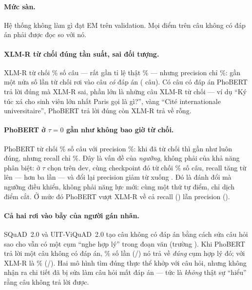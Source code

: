 \paragraph{Mức sàn.} Hệ thống không làm gì đạt EM \AbstainEM{} trên validation. Mọi điểm trên câu không
có đáp án phải được đọc so với nó.

\paragraph{XLM-R từ chối đúng tần suất, sai đối tượng.} XLM-R từ chối \XlmrAbsRate\% số câu --- rất gần
tỉ lệ thật \PctValImp\% --- nhưng precision chỉ \XlmrAbsPrec\%: gần một nửa số lần từ chối rơi vào câu
\emph{có} đáp án (\XlmrErrFalseAbs{} câu). Có \PairAnsOnlyP{} câu có đáp án PhoBERT trả lời đúng mà XLM-R
sai, phần lớn là những câu XLM-R từ chối --- ví dụ ``Ký túc xá cho sinh viên lớn nhất Paris gọi là gì?'',
vàng ``Cité internationale universitaire'', PhoBERT trả lời đúng còn XLM-R trả về rỗng.

\paragraph{PhoBERT ở $\tau = 0$ gần như không bao giờ từ chối.} PhoBERT từ chối \PhobertAbsRate\% số câu
với precision \PhobertAbsPrec\%: khi đã từ chối thì gần như luôn đúng, nhưng recall chỉ \PhobertAbsRec\%.
Đây là vấn đề của \emph{ngưỡng}, không phải của khả năng phân biệt: ở $\tau$ chọn trên dev, cùng checkpoint
đó từ chối \TunedPhobertAbsRate\% số câu, recall tăng từ \PhobertAbsRec{} lên \TunedPhobertAbsRec{} --- hơn
ba lần --- và đổi lại precision giảm từ \PhobertAbsPrec{} xuống \TunedPhobertAbsPrec. Đó là đánh đổi mà ngưỡng
điều khiển, không phải năng lực mới: cùng một thứ tự điểm, chỉ dịch điểm cắt. Ở mức đó PhoBERT vượt XLM-R về
cả recall (\TunedXlmrAbsRec) lẫn precision (\TunedXlmrAbsPrec).

\paragraph{Cả hai rơi vào bẫy của người gán nhãn.} SQuAD~2.0 và UIT-ViQuAD~2.0 tạo câu không có đáp án
bằng cách sửa câu hỏi sao cho vẫn có một cụm ``nghe hợp lý'' trong đoạn văn (trường
). Khi PhoBERT trả lời một câu không có đáp án, \PhobertTrapPct\% số lần
(\PhobertTrapHit/\PhobertTrapN) nó trả về \emph{đúng} cụm hợp lý đó; với XLM-R là \XlmrTrapPct\%
(\XlmrTrapHit/\XlmrTrapN). Hai mô hình tìm đúng thực thể khớp với câu hỏi, nhưng không nhận ra chi tiết
đã bị sửa làm câu hỏi mất đáp án --- tức là \emph{không} thật sự ``hiểu'' rằng câu không trả lời được.

